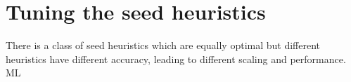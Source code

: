 \section{Tuning the seed heuristics}

There is a class of seed heuristics which are equally optimal but different
heuristics have different accuracy, leading to different \A scaling and
performance. ML